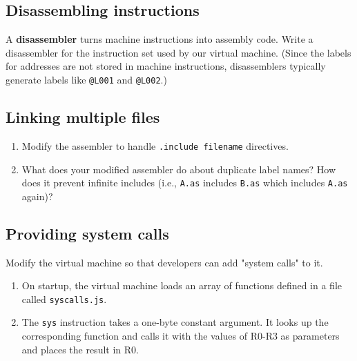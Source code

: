 \documentclass[krantzl]{krantz}
\newcommand{\glossref}[1]{\textbf{#1}}
\begin{document}
\subsection*{Disassembling instructions}


A \glossref{disassembler} turns machine instructions into assembly code.
Write a disassembler for the instruction set used by our virtual machine.
(Since the labels for addresses are not stored in machine instructions,
disassemblers typically generate labels like \texttt{@L001} and \texttt{@L002}.)

\subsection*{Linking multiple files}

\begin{enumerate}

\item 

Modify the assembler to handle \texttt{.include filename} directives.



\item 

What does your modified assembler do about duplicate label names?
    How does it prevent infinite includes
    (i.e., \texttt{A.as} includes \texttt{B.as} which includes \texttt{A.as} again)?



\end{enumerate}

\subsection*{Providing system calls}


Modify the virtual machine so that developers can add "system calls" to it.

\begin{enumerate}

\item 

On startup,
    the virtual machine loads an array of functions defined in a file called \texttt{syscalls.js}.



\item 

The \texttt{sys} instruction takes a one-byte constant argument.
    It looks up the corresponding function and calls it with the values of R0-R3 as parameters
    and places the result in R0.



\end{enumerate}
\end{document}

